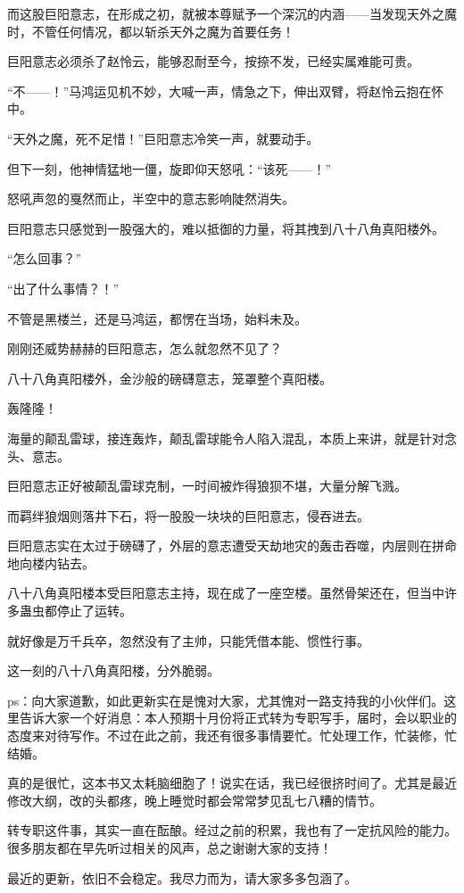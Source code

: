 \begin{this_body}
而这股巨阳意志，在形成之初，就被本尊赋予一个深沉的内涵——当发现天外之魔时，不管任何情况，都以斩杀天外之魔为首要任务！

巨阳意志必须杀了赵怜云，能够忍耐至今，按捺不发，已经实属难能可贵。

“不——！”马鸿运见机不妙，大喊一声，情急之下，伸出双臂，将赵怜云抱在怀中。

“天外之魔，死不足惜！”巨阳意志冷笑一声，就要动手。

但下一刻，他神情猛地一僵，旋即仰天怒吼：“该死——！”

怒吼声忽的戛然而止，半空中的意志影响陡然消失。

巨阳意志只感觉到一股强大的，难以抵御的力量，将其拽到八十八角真阳楼外。

“怎么回事？”

“出了什么事情？！”

不管是黑楼兰，还是马鸿运，都愣在当场，始料未及。

刚刚还威势赫赫的巨阳意志，怎么就忽然不见了？

八十八角真阳楼外，金沙般的磅礴意志，笼罩整个真阳楼。

轰隆隆！

海量的颠乱雷球，接连轰炸，颠乱雷球能令人陷入混乱，本质上来讲，就是针对念头、意志。

巨阳意志正好被颠乱雷球克制，一时间被炸得狼狈不堪，大量分解飞溅。

而羁绊狼烟则落井下石，将一股股一块块的巨阳意志，侵吞进去。

巨阳意志实在太过于磅礴了，外层的意志遭受天劫地灾的轰击吞噬，内层则在拼命地向楼内钻去。

八十八角真阳楼本受巨阳意志主持，现在成了一座空楼。虽然骨架还在，但当中许多蛊虫都停止了运转。

就好像是万千兵卒，忽然没有了主帅，只能凭借本能、惯性行事。

这一刻的八十八角真阳楼，分外脆弱。

ps：向大家道歉，如此更新实在是愧对大家，尤其愧对一路支持我的小伙伴们。这里告诉大家一个好消息：本人预期十月份将正式转为专职写手，届时，会以职业的态度来对待写作。不过在此之前，我还有很多事情要忙。忙处理工作，忙装修，忙结婚。

真的是很忙，这本书又太耗脑细胞了！说实在话，我已经很挤时间了。尤其是最近修改大纲，改的头都疼，晚上睡觉时都会常常梦见乱七八糟的情节。

转专职这件事，其实一直在酝酿。经过之前的积累，我也有了一定抗风险的能力。很多朋友都在早先听过相关的风声，总之谢谢大家的支持！

最近的更新，依旧不会稳定。我尽力而为，请大家多多包涵了。

\end{this_body}

